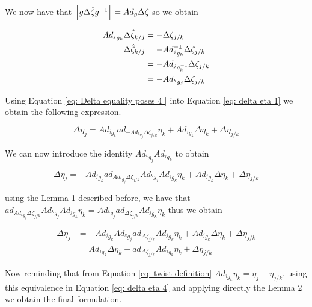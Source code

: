 \documentclass[12pt,a4paper]{book}
\begin{document}
We now have that $\left[ g \Delta \hat{\zeta} g ^{-1} \right] = Ad_g \Delta \zeta$ so we obtain

\begin{equation}\label{eq: Delta equality poses 4 }
\begin{aligned}
	Ad_{^j g _k } \Delta \hat{\zeta} _ {k/j}	&= - \Delta \zeta _{j/k} \\
	\Delta \hat{\zeta} _ {k/j}	&= - Ad_{^j g _k }  ^{-1} \Delta \zeta _{j/k} \\
								&= - Ad_{^j g _k ^{-1}}   \Delta \zeta _{j/k} \\
								&= - Ad_{^k g _j}   \Delta \zeta _{j/k} \\
\end{aligned}
\end{equation}

Using Equation \eqref{eq: Delta equality poses 4 } into Equation \eqref{eq: delta eta 1} we obtain the following expression.

\begin{equation}\label{eq: delta eta 2}
	\Delta \eta_j 	= Ad_{^j g_k} ad_{- Ad_{^k g _j}   \Delta \zeta _{j/k}} \eta_k + Ad_{^j g_k} \Delta \eta_k  + \Delta \eta_{j/k}
\end{equation}

We can now introduce the identity $Ad_{^k g _j}Ad_{^j g _k}$ to obtain

\begin{equation}\label{eq: delta eta 3}
	\Delta \eta_j 	= - Ad_{^j g_k} ad_{Ad_{^k g _j}   \Delta \zeta _{j/k}} Ad_{^k g _j}Ad_{^j g _k}  \eta_k + Ad_{^j g_k} \Delta \eta_k  + \Delta \eta_{j/k}
\end{equation}

using the Lemma 1 described before, we have that $ad_{Ad_{^k g _j}   \Delta \zeta _{j/k}} Ad_{^k g _j} Ad_{^j g _k}  \eta_k = Ad_{^k g _j} ad_{\Delta \zeta _{j/k}} Ad_{^j g _k}  \eta_k$ thus we obtain


\begin{equation}\label{eq: delta eta 4}
\begin{aligned}
	\Delta \eta_j 	&= - Ad_{^j g_k} Ad_{^k g _j} ad_{\Delta \zeta _{j/k}} Ad_{^j g _k}  \eta_k + Ad_{^j g_k} \Delta \eta_k  + \Delta \eta_{j/k} \\
					&= Ad_{^j g_k} \Delta \eta_k - ad_{\Delta \zeta _{j/k}} Ad_{^j g _k}  \eta_k +  \Delta \eta_{j/k} 
\end{aligned}
\end{equation}

Now reminding that from Equation \eqref{eq: twist definition} $Ad_{^j g _k}  \eta_k = \eta_j - \eta_{j/k}$. using this equivalence in Equation \eqref{eq: delta eta 4} and applying directly the Lemma 2 we obtain the final formulation.
\end{document}
